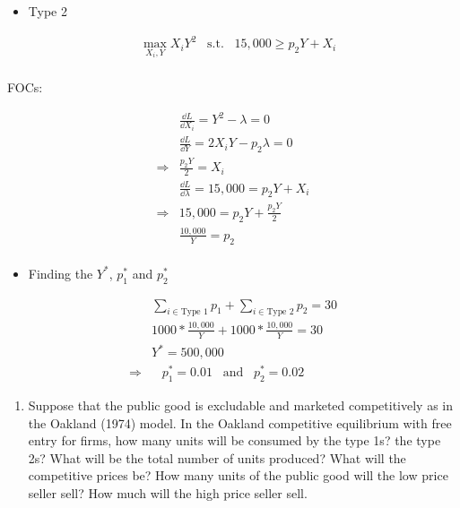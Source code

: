 \documentclass[]{article}
\providecommand{\tightlist}{%
  \setlength{\itemsep}{0pt}\setlength{\parskip}{0pt}}
\begin{document}
\begin{itemize}
\tightlist
\item
  Type 2
\end{itemize}

\begin{align*}
        & \max \limits_{X_i, Y} X_iY^2 \hspace{10pt} \text{s.t.} \hspace{10pt} 15,000 \geq p_2Y + X_i \\
\end{align*}

FOCs:

\begin{align*}
    &\frac{\dd L}{\dd X_i} = Y^2 - \lambda = 0  \\
    &\frac{\dd L}{\dd Y} = 2X_iY - p_2\lambda = 0  \\
    \Rightarrow & \frac{p_2Y}{2} = X_i \\
    &\frac{\dd L}{\dd \lambda} = 15,000  =  p_2Y + X_i \\
    \Rightarrow & 15,000 = p_2Y + \frac{p_2Y}{2} \\
    &\frac{10,000}{Y} = p_2 \\
\end{align*}

\begin{itemize}
\tightlist
\item
  Finding the \(Y^*\), \(p_1^*\) and \(p_2^*\)
\end{itemize}

\begin{align*}
    & \sum_{i \in \text{Type 1}} p_1 + \sum_{i \in \text{Type 2}} p_2 = 30 \\
    & 1000*\frac{10,000}{Y} + 1000*\frac{10,000}{Y} = 30 \\
    & \boxed{Y^*=500,000} \\
    \Rightarrow & \hspace{10pt} \boxed{p_1^*=0.01}  \hspace{10pt} \text{and} \hspace{10pt} \boxed{p_2^*=0.02} 
\end{align*}

\begin{enumerate}
\def\labelenumi{\alph{enumi})}
\setcounter{enumi}{1}
\tightlist
\item
  Suppose that the public good is excludable and marketed competitively
  as in the Oakland (1974) model. In the Oakland competitive equilibrium
  with free entry for firms, how many units will be consumed by the type
  1s? the type 2s? What will be the total number of units produced? What
  will the competitive prices be? How many units of the public good will
  the low price seller sell? How much will the high price seller sell.
\end{enumerate}
\end{document}
